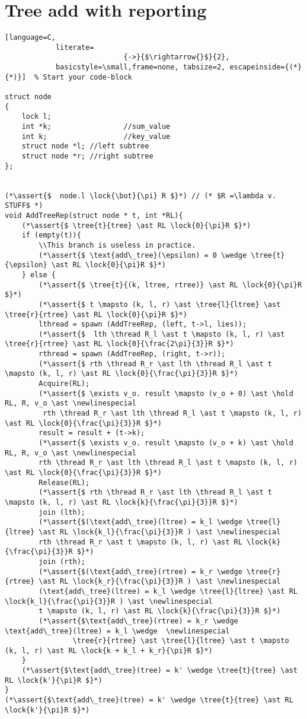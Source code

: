 \documentclass[8pt]{article}
\newcommand{\lock}[2]{ \square \hspace{-1ex} \xrightarrow[#1]{#2}}
\newcommand{\thread}{\ocircle \hspace{-1ex} \rightarrow}
\newcommand{\hold}{\text{Hold }}
\newcommand{\assert}[1]{\textcolor{blue}{ \{ #1 \}  } }
\newcommand{\tree}[2]{#1 \rightarrowtail #2}
\newcommand{\newlinespecial}{\newline \hphantom{100pt}}
\begin{document}


\newpage
\section{Tree add with reporting}
\begin{lstlisting}[language=C,
			literate=
               				{->}{$\rightarrow{}$}{2},
			basicstyle=\small,frame=none, tabsize=2, escapeinside={(*}{*)}]  % Start your code-block

struct node
{
	lock l;
	int *k;					//sum_value
	int k;					//key_value
	struct node *l; //left subtree
	struct node *r; //right subtree
};


(*\assert{$  node.l \lock{\bot}{\pi} R $}*) // (* $R =\lambda v.  STUFF$ *)
void AddTreeRep(struct node * t, int *RL){
	(*\assert{$ \tree{t}{tree} \ast RL \lock{0}{\pi}R $}*)
	if (empty(t)){
		\\This branch is useless in practice.
		(*\assert{$ \text{add\_tree}(\epsilon) = 0 \wedge \tree{t}{\epsilon} \ast RL \lock{0}{\pi}R $}*)
	} else {
		(*\assert{$ \tree{t}{(k, ltree, rtree)} \ast RL \lock{0}{\pi}R $}*)
		(*\assert{$ t \mapsto (k, l, r) \ast \tree{l}{ltree} \ast \tree{r}{rtree} \ast RL \lock{0}{\pi}R $}*)
		lthread = spawn (AddTreeRep, (left, t->l, lies));
		(*\assert{$  lth \thread R_l \ast t \mapsto (k, l, r) \ast \tree{r}{rtree} \ast RL \lock{0}{\frac{2\pi}{3}}R $}*)
		rthread = spawn (AddTreeRep, (right, t->r));
		(*\assert{$ rth \thread R_r \ast lth \thread R_l \ast t \mapsto (k, l, r) \ast RL \lock{0}{\frac{\pi}{3}}R $}*)
		Acquire(RL);
		(*\assert{$ \exists v_o. result \mapsto (v_o + 0) \ast \hold RL, R, v_o \ast \newlinespecial
		 rth \thread R_r \ast lth \thread R_l \ast t \mapsto (k, l, r) \ast RL \lock{0}{\frac{\pi}{3}}R $}*)
		result = result + (t->k);
		(*\assert{$ \exists v_o. result \mapsto (v_o + k) \ast \hold RL, R, v_o \ast \newlinespecial
		rth \thread R_r \ast lth \thread R_l \ast t \mapsto (k, l, r) \ast RL \lock{0}{\frac{\pi}{3}}R $}*)
		Release(RL);
		(*\assert{$ rth \thread R_r \ast lth \thread R_l \ast t \mapsto (k, l, r) \ast RL \lock{k}{\frac{\pi}{3}}R $}*)
		join (lth);
		(*\assert{$(\text{add\_tree}(ltree) = k_l \wedge \tree{l}{ltree} \ast RL \lock{k_l}{\frac{\pi}{3}}R ) \ast \newlinespecial
		rth \thread R_r \ast t \mapsto (k, l, r) \ast RL \lock{k}{\frac{\pi}{3}}R $}*)
		join (rth);
		(*\assert{$(\text{add\_tree}(rtree) = k_r \wedge \tree{r}{rtree} \ast RL \lock{k_r}{\frac{\pi}{3}}R ) \ast \newlinespecial
		(\text{add\_tree}(ltree) = k_l \wedge \tree{l}{ltree} \ast RL \lock{k_l}{\frac{\pi}{3}}R ) \ast \newlinespecial
		t \mapsto (k, l, r) \ast RL \lock{k}{\frac{\pi}{3}}R $}*)
		(*\assert{$\text{add\_tree}(rtree) = k_r \wedge \text{add\_tree}(ltree) = k_l \wedge  \newlinespecial
				\tree{r}{rtree} \ast \tree{l}{ltree} \ast t \mapsto (k, l, r) \ast RL \lock{k + k_l + k_r}{\pi}R $}*)
	}
	(*\assert{$\text{add\_tree}(tree) = k' \wedge \tree{t}{tree} \ast RL \lock{k'}{\pi}R $}*)
}	
(*\assert{$\text{add\_tree}(tree) = k' \wedge \tree{t}{tree} \ast RL \lock{k'}{\pi}R $}*)	

\end{lstlisting}
\end{document}
